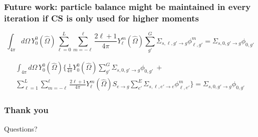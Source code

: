 \documentclass[xcolor=dvipsnames]{beamer}
\begin{document}
\begin{frame}
  \frametitle{Future work: particle balance might be maintained in every iteration if CS is only used for higher moments}

\begin{equation*}
\int_{4\pi} d\Omega \, Y_0^0(\hat{\Omega}) \sum_{\ell = 0}^L \sum_{m = -\ell}^{\ell} \frac{2\ell + 1}{4\pi} Y_\ell^m(\hat{\Omega}) \sum_{g'}^G \Sigma_{s,\ell,g' \to g} \phi_{\ell,g'}^m = \Sigma_{s,0,g' \to g} \phi_{0,g'}
\end{equation*}

\begin{multline*}
\int_{4\pi} d\Omega \, Y_0^0(\hat{\Omega}) \Big\{ \frac{1}{4\pi} Y_0^0(\hat{\Omega}) \sum_{g'}^G \Sigma_{s,0,g' \to g} \phi_{0,g'} \: + \\ \sum_{\ell = 1}^L \sum_{m = -\ell}^{\ell} \frac{2\ell + 1}{4\pi} Y_\ell^m(\hat{\Omega}) S_{e \to g} \sum_{e'}^E \Sigma_{s,\ell,e' \to e} \phi_{\ell,e'}^m \Big\} = \Sigma_{s,0,g' \to g} \phi_{0,g'}
\end{multline*}

\end{frame}





\begin{frame}[noframenumbering]
\frametitle{Thank you}
Questions?
\end{frame}
\end{document}
